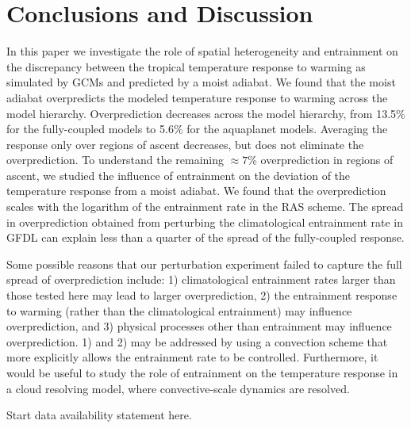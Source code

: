 \documentclass{ametsocV5}
\begin{document}
\section{Conclusions and Discussion}
In this paper we investigate the role of spatial heterogeneity and entrainment on the discrepancy between the tropical temperature response to warming as simulated by GCMs and predicted by a moist adiabat. We found that the moist adiabat overpredicts the modeled temperature response to warming across the model hierarchy. Overprediction decreases across the model hierarchy, from 13.5\% for the fully-coupled models to 5.6\% for the aquaplanet models. Averaging the response only over regions of ascent decreases, but does not eliminate the overprediction. To understand the remaining $\approx7$\% overprediction in regions of ascent, we studied the influence of entrainment on the deviation of the temperature response from a moist adiabat. We found that the overprediction scales with the logarithm of the entrainment rate in the RAS scheme. The spread in overprediction obtained from perturbing the climatological entrainment rate in GFDL can explain less than a quarter of the spread of the fully-coupled response. 

Some possible reasons that our perturbation experiment failed to capture the full spread of overprediction include: 1) climatological entrainment rates larger than those tested here may lead to larger overprediction, 2) the entrainment response to warming (rather than the climatological entrainment) may influence overprediction, and 3) physical processes other than entrainment may influence overprediction. 1) and 2) may be addressed by using a convection scheme that more explicitly allows the entrainment rate to be controlled.  Furthermore, it would be useful to study the role of entrainment on the temperature response in a cloud resolving model, where convective-scale dynamics are resolved.

%
\datastatement
Start data availability statement here.
\end{document}
